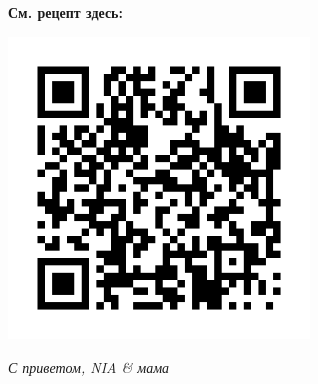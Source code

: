 \documentclass[a4paper, 14pt]{extarticle}
\begin{document}
  \begin{center}
    { \Large \textbf{См. рецепт здесь:} }

    \includegraphics[width=8cm]{qr-code}
  \end{center}
  \begin{flushright}
    \emph{С приветом, NIA \& мама}
  \end{flushright}
\end{document}
